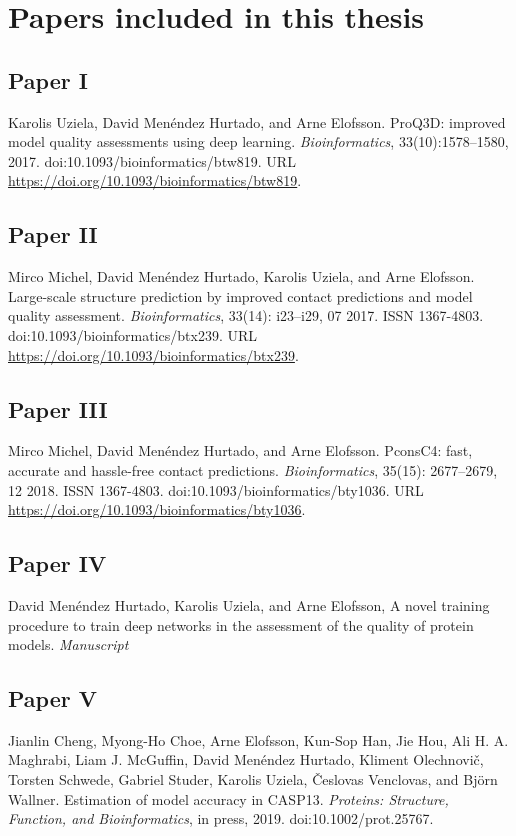 \chapter*{Papers included in this thesis}

\section*{Paper \textcolor[cmyk]{0, 0.87, 0.68, 0.32}{I}}
Karolis Uziela, David Menéndez Hurtado, and Arne Elofsson.
ProQ3D: improved model quality assessments using deep learning. \textit{Bioinformatics}, 33(10):1578–1580, 2017. doi:10.1093/bioinformatics/btw819.
URL \url{ https://doi.org/10.1093/bioinformatics/btw819}.

\section*{Paper  \textcolor[cmyk]{0, 0.87, 0.68, 0.32}{II}}
Mirco Michel, David Menéndez Hurtado, Karolis Uziela, and Arne Elofsson.
Large-scale structure
prediction by improved contact predictions and model quality assessment. \textit{Bioinformatics}, 33(14):
i23–i29, 07 2017. ISSN 1367-4803. doi:10.1093/bioinformatics/btx239. URL
\url{https://doi.org/10.1093/bioinformatics/btx239}.


\section*{Paper \textcolor[cmyk]{0, 0.87, 0.68, 0.32}{III}}
Mirco Michel, David Menéndez Hurtado, and Arne Elofsson. PconsC4: fast, accurate and hassle-free
contact predictions. \textit{Bioinformatics}, 35(15): 2677–2679, 12 2018. ISSN 1367-4803.
doi:10.1093/bioinformatics/bty1036. URL \url{https://doi.org/10.1093/bioinformatics/bty1036}.


\section*{Paper \textcolor[cmyk]{0, 0.87, 0.68, 0.32}{IV}}
David Menéndez Hurtado, Karolis Uziela, and Arne Elofsson, A novel training procedure to train deep networks in the assessment of the quality of protein models. \emph{Manuscript}


\section*{Paper \textcolor[cmyk]{0, 0.87, 0.68, 0.32}{V}}

Jianlin Cheng, Myong-Ho Choe, Arne Elofsson, Kun-Sop Han, Jie Hou, Ali H. A. Maghrabi, Liam J.
McGuffin, David Menéndez Hurtado, Kliment Olechnovič, Torsten Schwede, Gabriel Studer, Karolis
Uziela, Česlovas Venclovas, and Björn Wallner. Estimation of model accuracy in CASP13. \emph{Proteins:
Structure, Function, and Bioinformatics}, in press, 2019. doi:10.1002/prot.25767.

